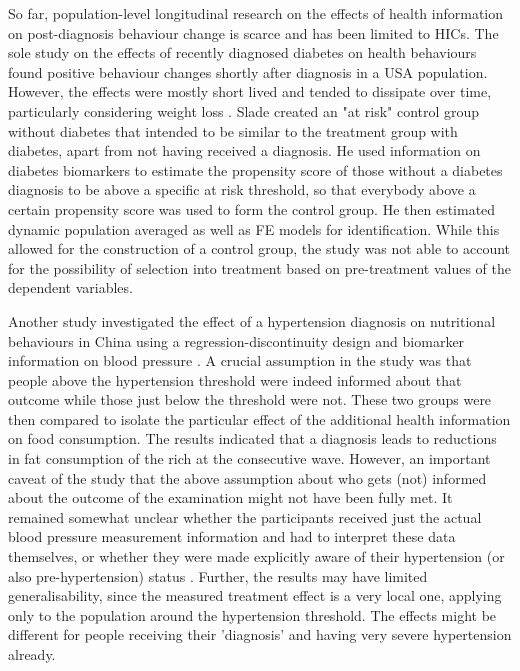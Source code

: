 So far, population-level longitudinal research on the effects of health information on post-diagnosis behaviour change is scarce and has been limited to \acp{HIC}. The sole study on the effects of recently diagnosed diabetes on health behaviours found positive behaviour changes shortly after diagnosis in a USA population. However, the effects were mostly short lived and tended to dissipate over time, particularly considering weight loss \autocite{Slade2012}. Slade created an "at risk" control group without diabetes that intended to be similar to the treatment group with diabetes, apart from not having received a diagnosis. He used information on diabetes biomarkers to estimate the propensity score of those without a diabetes diagnosis to be above a specific at risk threshold, so that everybody above a certain propensity score was used to form the control group. He then estimated dynamic population averaged as well as \ac{FE} models for identification. While this allowed for the construction of a control group, the study was not able to account for the possibility of selection into treatment based on pre-treatment values of the dependent variables.

Another study investigated the effect of a hypertension diagnosis on nutritional behaviours in China using a regression-discontinuity design and biomarker information on blood pressure \autocite{Zhao2013a}. A crucial assumption in the study was that people above the hypertension threshold were indeed informed about that outcome while those just below the threshold were not. These two groups were then compared to isolate the particular effect of the additional health information on food consumption. The results indicated that a diagnosis leads to reductions in fat consumption of the rich at the consecutive wave. However, an important caveat of the study that the above assumption about who gets (not) informed about the outcome of the examination might not have been fully met. It remained somewhat unclear whether the participants received just the actual blood pressure measurement information and had to interpret these data themselves, or whether they were made explicitly aware of their hypertension (or also pre-hypertension) status \autocite{Zhao2013a}. Further, the results may have limited generalisability, since the measured treatment effect is a very local one, applying only to the population around the hypertension threshold. The effects might be different for people receiving their 'diagnosis' and having very severe hypertension already.

